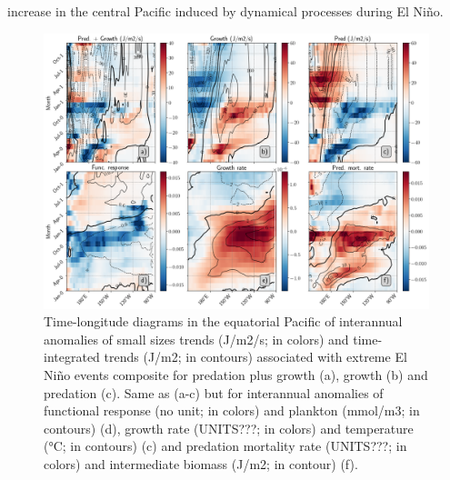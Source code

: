 increase in the central Pacific induced by dynamical processes during El Niño.  

\begin{figure}[h!tp]
	\centering
	\includegraphics[scale=0.4]{figs/fig8.png}	
	\caption{Time-longitude diagrams in the equatorial Pacific of interannual anomalies of small sizes trends (J/m2/s; in colors) and time-integrated trends (J/m2; in contours) associated with extreme El Niño events composite for predation plus growth (a), growth (b) and predation (c). Same as (a-c) but for interannual anomalies of functional response (no unit; in colors) and plankton (mmol/m3; in contours) (d), growth rate (UNITS???; in colors) and temperature (°C; in contours) (c) and predation mortality rate (UNITS???; in colors) and intermediate biomass (J/m2; in contour) (f).}
	\label{fig:fig8}
\end{figure}

